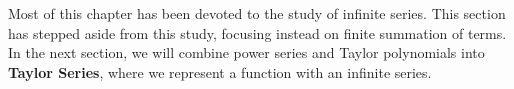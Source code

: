 \bigskip

Most of this chapter has been devoted to the study of infinite series. This section has stepped aside from this study, focusing instead on finite summation of terms. In the next section, we will combine power series and Taylor polynomials into \textbf{Taylor Series}, where we represent a function with an infinite series.


